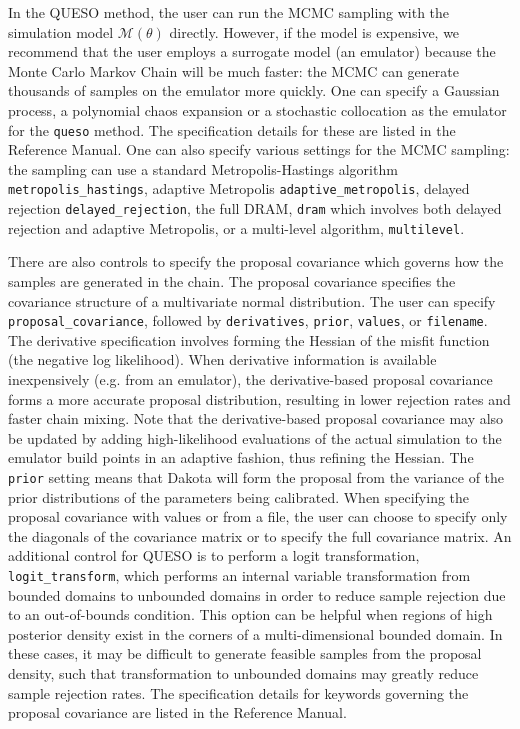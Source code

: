 In the QUESO method, the user can run the MCMC sampling with 
the simulation model $\mathcal{M}(\theta)$ directly. However, 
if the model is expensive, we recommend that the user employs 
a surrogate model (an emulator) because the Monte Carlo Markov Chain 
will be much faster:  the MCMC can generate thousands of samples 
on the emulator more quickly. One can specify a Gaussian process,
a polynomial chaos expansion or a stochastic collocation 
as the emulator for the \texttt{queso} method. The specification 
details for these are listed in the Reference Manual. 
One can also specify various settings for the MCMC sampling: 
the sampling can use a standard Metropolis-Hastings algorithm \texttt{metropolis\_hastings},
adaptive Metropolis \texttt{adaptive\_metropolis}, delayed rejection \texttt{delayed\_rejection},
the full DRAM, \texttt{dram} which involves both delayed rejection and adaptive Metropolis, 
or a multi-level algorithm, \texttt{multilevel}. 

There are also controls to specify the proposal covariance which governs how the samples 
are generated in the chain.  
The proposal covariance specifies the covariance structure of a multivariate normal distribution. 
The user can specify \texttt{proposal\_covariance}, followed by \texttt{derivatives}, \texttt{prior}, 
\texttt{values}, or \texttt{filename}.  The derivative specification involves 
forming the Hessian of the misfit function (the negative
log likelihood).  When derivative information is available inexpensively (e.g. from an emulator), 
the derivative-based proposal covariance forms a more
accurate proposal distribution, resulting in lower rejection rates and
faster chain mixing.  Note that the derivative-based proposal covariance may also be updated 
by adding high-likelihood evaluations of the actual simulation to the emulator build points in 
an adaptive fashion, thus refining the Hessian.  
The \texttt{prior} setting means that Dakota will form the proposal from the variance of the prior distributions of the 
parameters being calibrated.  When specifying the proposal covariance with values or from a file, the user 
can choose to specify only the diagonals of the covariance matrix or to specify the full covariance matrix.
An additional control for QUESO is to perform a logit transformation, \texttt{logit\_transform}, which 
performs an internal variable transformation from bounded domains to unbounded domains in order to reduce sample rejection due to an out-of-bounds condition.
This option can be helpful when regions of high posterior density exist
in the corners of a multi-dimensional bounded domain.  In these cases,
it may be difficult to generate feasible samples from the proposal density,
such that transformation to unbounded domains may greatly reduce sample
rejection rates.
The specification details for keywords governing the proposal covariance are listed in the Reference Manual. 
    
